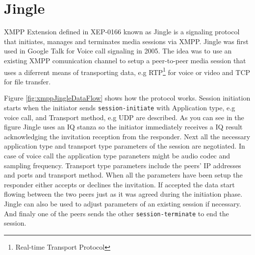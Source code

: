 \section{Jingle}
XMPP Extension defined in XEP-0166 \cite{xepJignle} known as Jingle is a signaling protocol that initiates, manages and terminates media sessions via XMPP. Jingle was first used in Google Talk \cite{googleTalk} for Voice call signaling in 2005. The idea was to use an existing XMPP comunication channel to setup a peer-to-peer media session that uses a diferrent means of transporting data, e.g RTP\footnote{Real-time Transport Protocol} for voice or video and TCP for file transfer. 

Figure \ref{fig:xmppJingleDataFlow} shows how the protocol works. Session initiation starts when the initiator sends \verb|session-initiate| with Application type, e.g voice call, and Transport method, e.g UDP are described. As you can see in the figure Jingle uses an IQ stanza so the initiator immediately receives a IQ result acknowledging the invitation reception from the responder. Next all the necessary application type and transport type parameters of the session are negotiated. In case of voice call the application type paraneters might be audio codec and sampling frequency. Transport type parameters include the peers' IP addresses and ports and transport method. When all the parameters have been setup the responder either accepts or declines the invitation. If accepted the data start flowing between the two peers just as it was agreed during the initiation phase. Jingle can also be used to adjust parameters of an existing session if necessary. And finaly one of the peers sends the other \verb|session-terminate| to end the session. 

